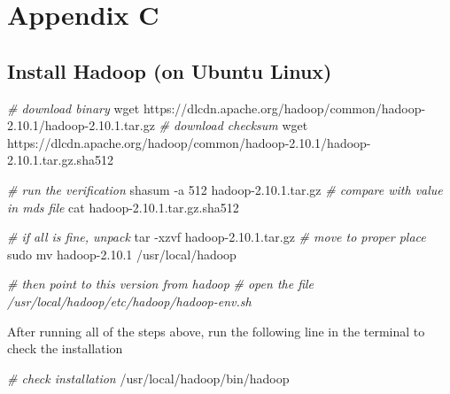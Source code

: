 \documentclass[
  12pt,
]{style/krantz}
\newenvironment{Shaded}{\begin{snugshade}}{\end{snugshade}}
\newcommand{\AttributeTok}[1]{\textcolor[rgb]{0.77,0.63,0.00}{#1}}
\newcommand{\BuiltInTok}[1]{#1}
\newcommand{\CommentTok}[1]{\textcolor[rgb]{0.56,0.35,0.01}{\textit{#1}}}
\newcommand{\ExtensionTok}[1]{#1}
\newcommand{\FunctionTok}[1]{\textcolor[rgb]{0.00,0.00,0.00}{#1}}
\newcommand{\KeywordTok}[1]{\textcolor[rgb]{0.13,0.29,0.53}{\textbf{#1}}}
\newcommand{\NormalTok}[1]{#1}
\newcommand{\OperatorTok}[1]{\textcolor[rgb]{0.81,0.36,0.00}{\textbf{#1}}}
\newcommand{\StringTok}[1]{\textcolor[rgb]{0.31,0.60,0.02}{#1}}
\newcommand{\VariableTok}[1]{\textcolor[rgb]{0.00,0.00,0.00}{#1}}
\begin{document}
\hypertarget{appendix-c}{%
\chapter{Appendix C}\label{appendix-c}}

\hypertarget{install-hadoop-on-ubuntu-linux}{%
\section{Install Hadoop (on Ubuntu Linux)}\label{install-hadoop-on-ubuntu-linux}}

\begin{Shaded}
\begin{Highlighting}[]
\CommentTok{\# download binary}
\FunctionTok{wget}\NormalTok{ https://dlcdn.apache.org/hadoop/common/hadoop{-}2.10.1/hadoop{-}2.10.1.tar.gz}
\CommentTok{\# download checksum}
\FunctionTok{wget}\NormalTok{ https://dlcdn.apache.org/hadoop/common/hadoop{-}2.10.1/hadoop{-}2.10.1.tar.gz.sha512}

\CommentTok{\# run the verification}
\ExtensionTok{shasum} \AttributeTok{{-}a}\NormalTok{ 512 hadoop{-}2.10.1.tar.gz}
\CommentTok{\# compare with value in mds file}
\FunctionTok{cat}\NormalTok{ hadoop{-}2.10.1.tar.gz.sha512}

\CommentTok{\# if all is fine, unpack}
\FunctionTok{tar} \AttributeTok{{-}xzvf}\NormalTok{ hadoop{-}2.10.1.tar.gz}
\CommentTok{\# move to proper place}
\FunctionTok{sudo}\NormalTok{ mv hadoop{-}2.10.1 /usr/local/hadoop}


\CommentTok{\# then point to this version from hadoop}
\CommentTok{\# open the file /usr/local/hadoop/etc/hadoop/hadoop{-}env.sh}
\end{Highlighting}
\end{Shaded}

\begin{Shaded}
\end{Shaded}

After running all of the steps above, run the following line in the terminal to check the installation

\begin{Shaded}
\begin{Highlighting}[]
\CommentTok{\# check installation}
\ExtensionTok{/usr/local/hadoop/bin/hadoop}
\end{Highlighting}
\end{Shaded}


  

\backmatter
\printindex
\end{document}
